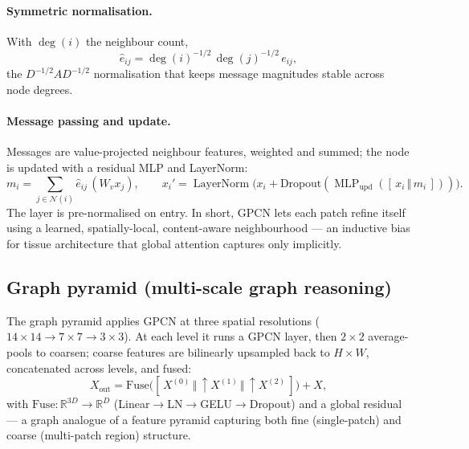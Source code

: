 \documentclass[11pt]{article}
\DeclareMathOperator{\MLP}{MLP}
\DeclareMathOperator{\LN}{LayerNorm}
\begin{document}
\paragraph{Symmetric normalisation.} With $\deg(i)$ the neighbour count,
\begin{equation}
\hat e_{ij}=\deg(i)^{-1/2}\,\deg(j)^{-1/2}\,e_{ij},
\label{eq:norm}
\end{equation}
the $D^{-1/2}AD^{-1/2}$ normalisation that keeps message magnitudes stable across
node degrees.

\paragraph{Message passing and update.} Messages are value-projected neighbour
features, weighted and summed; the node is updated with a residual MLP and
LayerNorm:
\begin{equation}
m_i=\sum_{j\in\mathcal{N}(i)}\hat e_{ij}\,(W_v x_j),\qquad
x_i'=\LN\!\big(x_i + \mathrm{Dropout}(\MLP_{\text{upd}}([\,x_i\,\Vert\,m_i\,]))\big).
\label{eq:update}
\end{equation}
The layer is pre-normalised on entry. In short, GPCN lets each patch refine itself
using a learned, spatially-local, content-aware neighbourhood — an inductive bias
for tissue architecture that global attention captures only implicitly.

\subsection{Graph pyramid (multi-scale graph reasoning)}
\label{sec:pyramid}
The graph pyramid applies GPCN at three spatial resolutions
($14\times14\rightarrow7\times7\rightarrow3\times3$). At each level it runs a GPCN
layer, then $2\times2$ average-pools to coarsen; coarse features are bilinearly
upsampled back to $H\times W$, concatenated across levels, and fused:
\begin{equation}
X_{\text{out}}=\mathrm{Fuse}\big([\,X^{(0)}\,\Vert\,\uparrow X^{(1)}\,\Vert\,\uparrow X^{(2)}\,]\big)+X,
\label{eq:pyramid}
\end{equation}
with $\mathrm{Fuse}:\mathbb{R}^{3D}\!\to\!\mathbb{R}^{D}$
(Linear$\to$LN$\to$GELU$\to$Dropout) and a global residual — a graph analogue of a
feature pyramid capturing both fine (single-patch) and coarse (multi-patch region)
structure.
\end{document}
